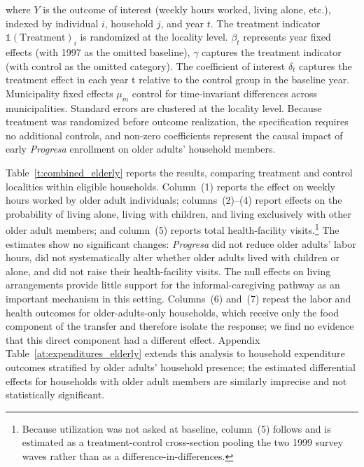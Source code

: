 \documentclass[12pt]{article}
\begin{document}
\p where $Y$ is the outcome of interest (weekly hours worked, living alone, etc.), indexed by individual $i$, household $j$, and year $t$. The treatment indicator $\mathds{1}(\text{Treatment})_i$ is randomized at the locality level. $\beta_t$ represents year fixed effects (with 1997 as the omitted baseline), $\gamma$ captures the treatment indicator (with control as the omitted category). The coefficient of interest $\delta_t$ captures the treatment effect in each year t relative to the control group in the baseline year. Municipality fixed effects $\mu_m$ control for time-invariant differences across municipalities. Standard errors are clustered at the locality level. Because treatment was randomized before outcome realization, the specification requires no additional controls, and non-zero coefficients represent the causal impact of early \textit{Progresa} enrollment on older adults' household members.

\p Table~\ref{t:combined_elderly} reports the results, comparing treatment and control localities within eligible households. Column~(1) reports the effect on weekly hours worked by older adult individuals; columns~(2)--(4) report effects on the probability of living alone, living with children, and living exclusively with other older adult members; and column~(5) reports total health-facility visits.\footnote{Because utilization was not asked at baseline, column~(5) follows \cite{Gertler2000IFPRI} and is estimated as a treatment-control cross-section pooling the two 1999 survey waves rather than as a difference-in-differences.} The estimates show no significant changes: \textit{Progresa} did not reduce older adults' labor hours, did not systematically alter whether older adults lived with children or alone, and did not raise their health-facility visits. The null effects on living arrangements provide little support for the informal-caregiving pathway as an important mechanism in this setting. Columns~(6) and~(7) repeat the labor and health outcomes for older-adults-only households, which receive only the food component of the transfer and therefore isolate the response; we find no evidence that this direct component had a different effect. Appendix Table~\ref{at:expenditures_elderly} extends this analysis to household expenditure outcomes stratified by older adults' household presence; the estimated differential effects for households with older adult members are similarly imprecise and not statistically significant.
\end{document}
